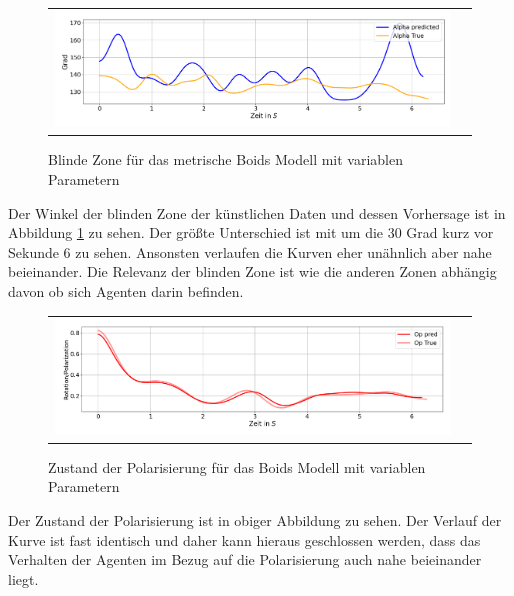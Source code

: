 \begin{figure}[H]
\centering
\begin{tabular}{cc}
\includegraphics[width=1.0\textwidth]{figures/Experimente/Parameter_variabel/Boids_Alpha.png} 
\end{tabular}
\caption{Blinde Zone für das metrische Boids Modell mit variablen Parametern \label{fig:Boids_PV_Alpha}}
\end{figure}

Der Winkel der blinden Zone der künstlichen Daten und dessen Vorhersage ist in Abbildung \ref{fig:Boids_PV_Alpha} zu sehen.
Der größte Unterschied ist mit um die 30 Grad kurz vor Sekunde 6 zu sehen. Ansonsten verlaufen die Kurven eher unähnlich aber nahe beieinander. Die Relevanz der blinden Zone ist wie die anderen Zonen abhängig davon ob sich Agenten darin befinden.



\begin{figure}[H]
\centering
\begin{tabular}{cc}
\includegraphics[width=1.0\textwidth]{figures/Experimente/Parameter_variabel/Boids_POL.png} 
\end{tabular}
\caption{Zustand der Polarisierung für das Boids Modell mit variablen Parametern \label{fig:Boids_PV_POL}}
\end{figure}

Der Zustand der Polarisierung ist in obiger Abbildung zu sehen. Der Verlauf der Kurve ist fast identisch und daher kann hieraus geschlossen werden, dass das Verhalten der Agenten im Bezug auf die Polarisierung auch nahe beieinander liegt.

